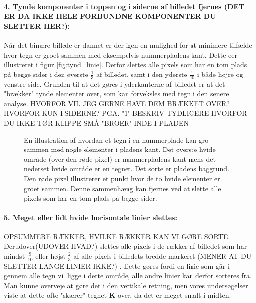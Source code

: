 \paragraph{4. Tynde komponenter i toppen og i siderne af billedet fjernes (DET ER DA IKKE HELE FORBUNDNE KOMPONENTER DU SLETTER HER?):}
Når det binære billede er dannet er der igen en mulighed for at minimere tilfælde hvor tegn er groet sammen med eksempelvis nummerpladens kant. Dette eer illustreret i figur \vref{fig:tynd_linie}. Derfor slettes alle pixels som har en tom plads på begge sider i den øverste $\frac{1}{3}$ af billedet, samt i den yderste $\frac{1}{10}$ i både højre og venstre side. Grunden til at det gøres i yderkanterne af billedet er at det "brækker" tynde elementer over, som kan forveksles med tegn i den senere analyse. HVORFOR VIL JEG GERNE HAVE DEM BRÆKKET OVER? HVORFOR KUN I SIDERNE? PGA. "1" BESKRIV TYDLIGERE HVORFOR DU IKKE TØR KLIPPE SMÅ "BROER" INDE I PLADEN


\begin{figure}[htp]
\centering
{} 
\caption{En illustration af hvordan et tegn i en nummerplade kan gro sammen med nogle elementer i pladens kant. Det øverste hvide område (over den røde pixel) er nummerpladens kant mens det nederset hvide område er en tegnet. Det sorte er pladens baggrund. Den røde pixel illustrerer et punkt hvor de to hvide elementer er groet sammen. Denne sammenhæng kan fjernes ved at slette alle pixels som har en tom plads på begge sider.}
\label{fig:tynd_linie}
\end{figure}

\paragraph{5. Meget eller lidt hvide horisontale linier slettes:}
OPSUMMERE RÆKKER, HVILKE RÆKKER KAN VI GØRE SORTE. Derudover(UDOVER HVAD?) slettes alle pixels i de rækker af billedet som har mindst $\frac{9}{10}$ eller højst $\frac{2}{3}$ af alle pixels i billedets bredde markeret (MENER AT DU SLETTER LANGE LINIER IKKE?) . Dette gøres fordi en linie som går i gennem alle tegn vil ligge i dette område, alle andre linier kan derfor sorteres fra. Man kunne overveje at gøre det i den vertikale retning, men vores undersøgelser viste at dette ofte "skærer" tegnet \textbf{K} over, da det er meget smalt i midten.


